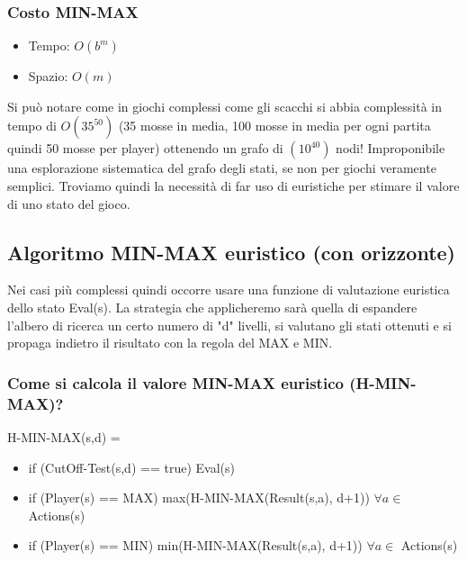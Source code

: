 \documentclass{article}
\begin{document}
\subsubsection{Costo MIN-MAX}
\begin{itemize}
    \item Tempo: $O(b^m)$
    \item Spazio: $O(m)$
\end{itemize}
Si può notare come in giochi complessi come gli scacchi si abbia complessità in tempo di $O(35^{50})$ (35 mosse in media, 100 mosse in media per ogni partita quindi 50 mosse per player) ottenendo un grafo di $(10^{40})$ nodi! Improponibile una esplorazione sistematica del grafo degli stati, se non per giochi veramente semplici. Troviamo quindi la necessità di far uso di euristiche per stimare il valore di uno stato del gioco.

\subsection{Algoritmo MIN-MAX euristico (con orizzonte)}
Nei casi più complessi quindi occorre usare una funzione di valutazione euristica dello stato Eval(s). La strategia che applicheremo sarà quella di espandere l'albero di ricerca un certo numero di "d" livelli, si valutano gli stati ottenuti e si propaga indietro il risultato con la regola del MAX e MIN.

\subsubsection{Come si calcola il valore MIN-MAX euristico (H-MIN-MAX)?}
H-MIN-MAX(s,d) =
\begin{itemize}
    \item if (CutOff-Test(s,d) == true) Eval(s)
    \item if (Player(s) == MAX) max(H-MIN-MAX(Result(s,a), d+1)) $\forall a \in$ Actions(s)
    \item if (Player(s) == MIN) min(H-MIN-MAX(Result(s,a), d+1)) $\forall a \in$ Actions(s)
\end{itemize}
\end{document}
